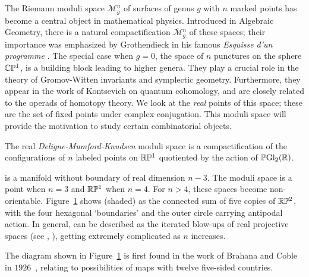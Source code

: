 \documentclass[10pt]{amsart}
\begin{document}
\subsection{}
The Riemann moduli space ${\mathcal M}_g^n$ of surfaces of genus $g$ with $n$ marked points has become a central object in mathematical physics.  Introduced in Algebraic Geometry, there is a natural compactification ${\overline{\mathcal M}}{_g^n}$ of these spaces; their importance was emphasized by Grothendieck in his famous \emph{Esquisse d'un programme} \cite{gro}. The special case when $g=0$, the space  of $n$ punctures on the sphere ${\mathbb C}{\mathbb P}^1$, is a building block leading to higher genera. They play a crucial role in the theory of Gromov-Witten invariants and symplectic geometry. Furthermore, they appear in the work of Kontsevich on quantum cohomology, and are closely related to the operads of homotopy theory.  We look at the {\em real} points  of this space; these are the set of fixed points under complex conjugation.  This moduli space will provide the motivation to study certain combinatorial objects.

\begin{defn}
The real {\em Deligne-Mumford-Knudsen} moduli space  is a compactification of the configurations of $n$ labeled points on ${\mathbb R} {\mathbb P}^1$ quotiented by the action of ${\mathbb P} {\rm Gl}_2({\mathbb R})$.
\end{defn}

 is a manifold without boundary of real dimension $n-3$. The moduli space is a point when $n=3$ and ${\mathbb R}{\mathbb P}^1$ when $n=4$. For $n>4$, these spaces become non-orientable. Figure~\ref{m05} shows  (shaded) as the connected sum of five copies of ${\mathbb R} {\mathbb P}^2$, with the four hexagonal `boundaries' and the outer circle carrying antipodal action.  In general,  can be described as the iterated blow-ups of real projective spaces (see \cite[\S4]{kap}, \cite[\S4]{dev}), getting extremely complicated as $n$ increases.

\begin{figure}[h]
\caption{}
\label{m05}
\end{figure}

\begin{rem}
The diagram shown in Figure~\ref{m05} is first found in the work of Brahana and Coble in $1926$~\cite[\S1]{bc}, relating to possibilities of maps with twelve five-sided countries.
\end{rem}

\end{document}
